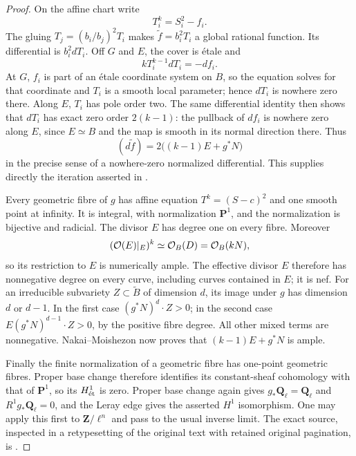 \begin{proof}
On the affine chart write
\[
                         T_i^k=S_i^2-f_i.
\]
The gluing $T_j=(b_i/b_j)^2T_i$ makes
$\widetilde f=b_i^2T_i$ a global rational function.  Its differential is $b_i^2dT_i$.  Off $G$ and $E$, the cover is \'etale and
\[
                   kT_i^{k-1}dT_i=-df_i.
\]
At $G$, $f_i$ is part of an \'etale coordinate system on $B$, so the equation solves for that coordinate and $T_i$ is a smooth local parameter; hence $dT_i$ is nowhere zero there.  Along $E$, $T_i$ has pole order two.  The same differential identity then shows that $dT_i$ has exact zero order $2(k-1)$: the pullback of $df_i$ is nowhere zero along $E$, since $E\simeq B$ and the map is smooth in its normal direction there.  Thus
\[
       (d\widetilde f)=2\bigl((k-1)E+g^*N\bigr)
\]
in the precise sense of a nowhere-zero normalized differential.  This supplies directly the iteration asserted in
\cite[Proposition~2.3 and its proof, p.~8]{Mukai2011Kodaira}.

Every geometric fibre of $g$ has affine equation $T^k=(S-c)^2$ and one smooth point at infinity.  It is integral, with normalization $\mathbf P^1$, and the normalization is bijective and radicial.  The divisor $E$ has degree one on every fibre.  Moreover
\[
       (\OO(E)|_E)^k\simeq\OO_B(D)=\OO_B(kN),
\]
so its restriction to $E$ is numerically ample.  The effective divisor $E$ therefore has nonnegative degree on every curve, including curves contained in $E$; it is nef.  For an irreducible subvariety $Z\subset\widetilde B$ of dimension $d$, its image under $g$ has dimension $d$ or $d-1$.  In the first case $(g^*N)^d\cdot Z>0$; in the second case $E(g^*N)^{d-1}\cdot Z>0$, by the positive fibre degree.  All other mixed terms are nonnegative.  Nakai--Moishezon now proves that $(k-1)E+g^*N$ is ample.

Finally the finite normalization of a geometric fibre has one-point geometric fibres.  Proper base change therefore identifies its constant-sheaf cohomology with that of $\mathbf P^1$, so its $H^1_{\et}$ is zero.  Proper base change again gives $g_*\mathbf Q_\ell=\mathbf Q_\ell$ and $R^1g_*\mathbf Q_\ell=0$, and the Leray edge gives the asserted $H^1$ isomorphism.  One may apply this first to $\mathbf Z/\ell^n$ and pass to the usual inverse limit.  The exact source, inspected in a retypesetting of the original text with retained original pagination, is \cite[Expos\'e~XII, Theorem~5.1 and Corollary~5.2, original pp.~88--89]{SGA4III1973}.
\end{proof}

